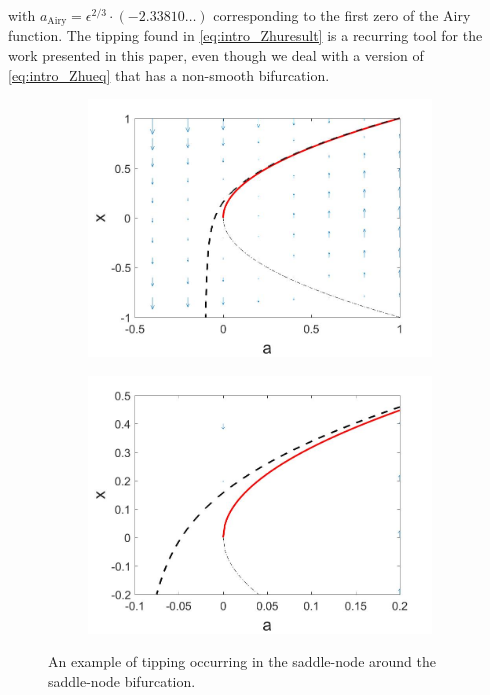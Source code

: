 with $a_{\text{Airy}}=\epsilon^{2/3}\cdot(-2.33810\ldots)$ corresponding to the first zero of the Airy function. The tipping found in \eqref{eq:intro_Zhuresult} is a recurring tool for the work presented in this paper, even though we deal with a version of \eqref{eq:intro_Zhueq} that has a non-smooth bifurcation.

\begin{figure}[H]
\centering
\begin{subfigure}{.5\textwidth}
  \centering
  \includegraphics[width=\linewidth]{intro/saddlenode_tipping.jpg}
  \caption{}
\end{subfigure}%
\begin{subfigure}{.5\textwidth}
  \centering
  \includegraphics[width=\linewidth]{intro/saddlenode_tipping_zoom.jpg}
  \caption{}
\end{subfigure}
\caption{An example of tipping occurring in the saddle-node around the saddle-node bifurcation.}
\label{fig:intro_tipping}
\end{figure}


